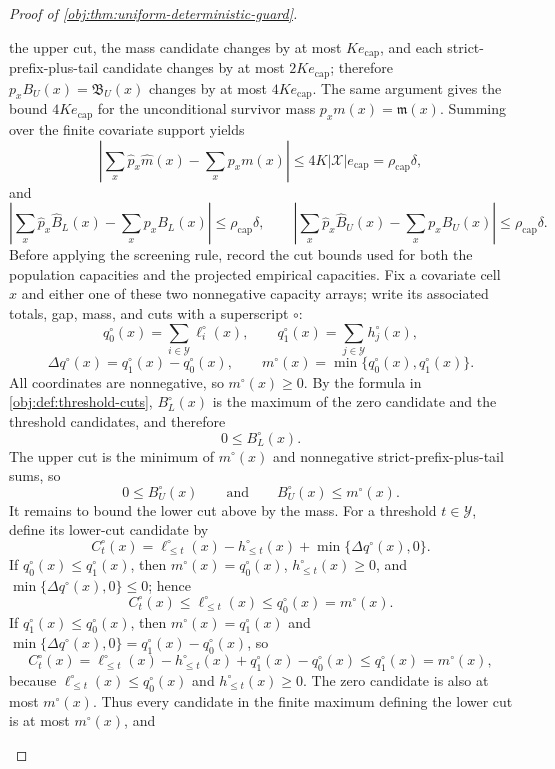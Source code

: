 \begin{proof}[Proof of \cref{obj:thm:uniform-deterministic-guard}]
\begin{enumerate}
the upper cut, the mass candidate changes by at most \(Ke_{\mathrm{cap}}\), and
each strict-prefix-plus-tail candidate changes by at most \(2Ke_{\mathrm{cap}}\);
therefore \(p_xB_U(x)=\mathfrak B_U(x)\) changes by at most
\(4Ke_{\mathrm{cap}}\).  The same argument gives the bound
\(4Ke_{\mathrm{cap}}\) for the unconditional survivor mass
\(p_xm(x)=\mathfrak m(x)\).  Summing over the finite covariate support yields
\[
\left|
\sum_x \widehat p_x\widehat m(x)-\sum_x p_xm(x)
\right|
\le
4K|\mathcal X|e_{\mathrm{cap}}
=
\rho_{\mathrm{cap}}\delta,
\]
and
\[
\left|
\sum_x \widehat p_x\widehat B_L(x)-\sum_x p_xB_L(x)
\right|
\le
\rho_{\mathrm{cap}}\delta,
\qquad
\left|
\sum_x \widehat p_x\widehat B_U(x)-\sum_x p_xB_U(x)
\right|
\le
\rho_{\mathrm{cap}}\delta.
\]
Before applying the screening rule, record the cut bounds used for both the
population capacities and the projected empirical capacities.  Fix a covariate
cell \(x\) and either one of these two nonnegative capacity arrays; write its
associated totals, gap, mass, and cuts with a superscript \(\circ\):
\[
q_0^\circ(x)=\sum_{i\in\mathcal Y}\ell_i^\circ(x),
\qquad
q_1^\circ(x)=\sum_{j\in\mathcal Y}h_j^\circ(x),
\]
\[
\Delta q^\circ(x)=q_1^\circ(x)-q_0^\circ(x),
\qquad
m^\circ(x)=\min\{q_0^\circ(x),q_1^\circ(x)\}.
\]
All coordinates are nonnegative, so \(m^\circ(x)\ge0\).  By the formula in
\cref{obj:def:threshold-cuts}, \(B_L^\circ(x)\) is the maximum of the zero
candidate and the threshold candidates, and therefore
\[
0\le B_L^\circ(x).
\]
The upper cut is the minimum of \(m^\circ(x)\) and nonnegative
strict-prefix-plus-tail sums, so
\[
0\le B_U^\circ(x)
\qquad\text{and}\qquad
B_U^\circ(x)\le m^\circ(x).
\]
It remains to bound the lower cut above by the mass.  For a threshold
\(t\in\mathcal Y\), define its lower-cut candidate by
\[
C_t^\circ(x)
=
\ell_{\le t}^\circ(x)-h_{\le t}^\circ(x)
+\min\{\Delta q^\circ(x),0\}.
\]
If \(q_0^\circ(x)\le q_1^\circ(x)\), then
\(m^\circ(x)=q_0^\circ(x)\), \(h_{\le t}^\circ(x)\ge0\), and
\(\min\{\Delta q^\circ(x),0\}\le0\); hence
\[
C_t^\circ(x)
\le
\ell_{\le t}^\circ(x)
\le
q_0^\circ(x)
=
m^\circ(x).
\]
If \(q_1^\circ(x)\le q_0^\circ(x)\), then
\(m^\circ(x)=q_1^\circ(x)\) and
\(\min\{\Delta q^\circ(x),0\}=q_1^\circ(x)-q_0^\circ(x)\), so
\[
C_t^\circ(x)
=
\ell_{\le t}^\circ(x)-h_{\le t}^\circ(x)
+q_1^\circ(x)-q_0^\circ(x)
\le
q_1^\circ(x)
=
m^\circ(x),
\]
because \(\ell_{\le t}^\circ(x)\le q_0^\circ(x)\) and
\(h_{\le t}^\circ(x)\ge0\).  The zero candidate is also at most
\(m^\circ(x)\).  Thus every candidate in the finite maximum defining the lower
cut is at most \(m^\circ(x)\), and

\end{enumerate}
\end{proof}

